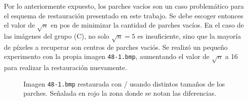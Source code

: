  Por lo anteriormente expuesto, los parches vac\'ios son un caso problem\'atico para el esquema de restauraci\'on presentado en este trabajo. Se debe escoger entonces el valor de $\sqrt{n}$ en pos de minimizar la cantidad de parches vac\'ios. En el caso de las im\'agenes del grupo (C), no solo $\sqrt{n} = 5$ es insuficiente, sino que la mayor\'ia de p\'ixeles a recuperar son centros de parches vaci\'os. Se realiz\'o un pequeño experimento con la propia imagen \texttt{48-1.bmp}, aumentando el valor de $\sqrt{n}$ a 16 para realizar la restauraci\'on nuevamente.
 \begin{figure}[H]
 	\centering
 	\caption{Imagen \texttt{48-1.bmp} restaurada con \SOP/ usando distintos tamaños de los parches. Señalada en rojo la zona donde se notan las diferencias.}
 	\label{fig:patches_diffs}
 \end{figure}

